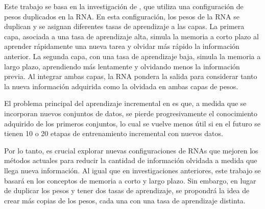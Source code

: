 Este trabajo se basa en la investigación de \cite{bullinaria2009}, que utiliza una configuración de pesos duplicados en la RNA. En esta configuración, los pesos de la RNA se duplican y se asignan diferentes tasas de aprendizaje a las capas. La primera capa, asociada a una tasa de aprendizaje alta, simula la memoria a corto plazo al aprender rápidamente una nueva tarea y olvidar más rápido la información anterior. La segunda capa, con una tasa de aprendizaje baja, simula la memoria a largo plazo, aprendiendo más lentamente y olvidando menos la información previa. Al integrar ambas capas, la RNA pondera la salida para considerar tanto la nueva información adquirida como la olvidada en ambas capas de pesos.

El problema principal del aprendizaje incremental en \cite{bullinaria2009} es que, a medida que se incorporan nuevos conjuntos de datos, se pierde progresivamente el conocimiento adquirido de los primeros conjuntos, lo cual se vuelve menos útil si en el futuro se tienen 10 o 20 etapas de entrenamiento incremental con nuevos datos.

Por lo tanto, es crucial explorar nuevas configuraciones de RNAs que mejoren los métodos actuales para reducir la cantidad de información olvidada a medida que llega nueva información. Al igual que en investigaciones anteriores, este trabajo se basará en los conceptos de memoria a corto y largo plazo. Sin embargo, en lugar de duplicar los pesos y tener dos tasas de aprendizaje, se propondrá la idea de crear más copias de los pesos, cada una con una tasa de aprendizaje distinta.
